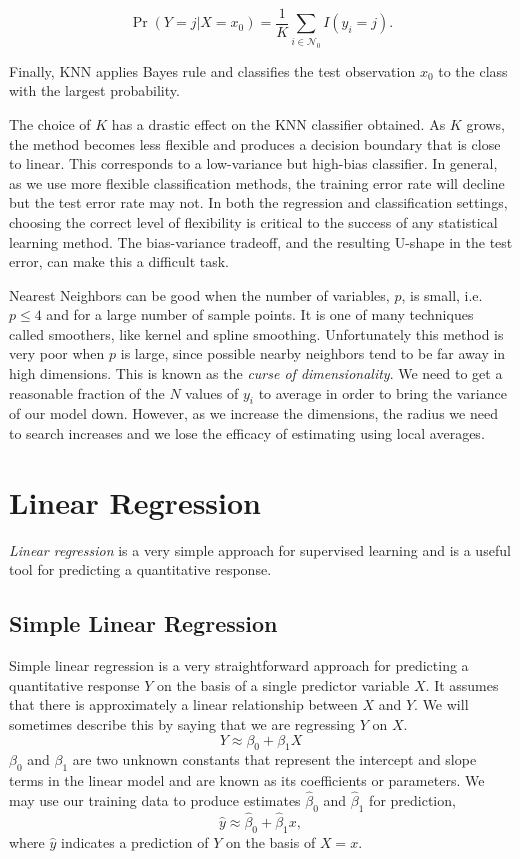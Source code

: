 \documentclass{article}
\numberwithin{equation}{section}
\begin{document}
\begin{equation}
    \Pr(Y = j|X = x_0) = \frac{1}{K} \sum_{i \in \mathcal N_0} I(y_i = j).
\end{equation}

Finally, KNN applies Bayes rule and classifies the test observation $x_0$ to the class with the largest probability.

The choice of $K$ has a drastic effect on the KNN classifier obtained. As $K$ grows, the method becomes less flexible and produces a decision boundary that is close to linear. This corresponds to a low-variance but high-bias classifier. In
general, as we use more flexible classification methods, the training error rate will decline but the test error rate may not. In both the regression and classification settings, choosing the correct level of flexibility is critical to the success of any statistical learning method. The bias-variance tradeoff, and the resulting U-shape in the test error, can make this a difficult task. 

Nearest Neighbors can be good when the number of variables, $p$, is small, i.e. $p \leq 4$ and for a large number of sample points. It is one of many techniques called smoothers, like kernel and spline smoothing. Unfortunately this method is very poor when $p$ is large, since possible nearby neighbors tend to be far away in high dimensions. This is known as the \textit{curse of dimensionality}. We need to get a reasonable fraction of the $N$ values of $y_i$ to average in order to bring the variance of our model down. However, as we increase the dimensions, the radius we need to search increases and we lose the efficacy of estimating using local averages.

\newpage
\section{Linear Regression}
\textit{Linear regression} is a very simple approach for supervised learning and is a useful tool for predicting a quantitative response.

\subsection{Simple Linear Regression}

Simple linear regression  is a very straightforward approach for predicting a quantitative response $Y$ on the basis of a single predictor variable $X$. It assumes that there is approximately a linear relationship between $X$ and $Y$. We will sometimes describe this by saying that we are regressing $Y$ on $X$.
\begin{equation}
    Y \approx \beta_0 + \beta_1 X
\end{equation}
$\beta_0$ and $\beta_1$ are two unknown constants that represent the intercept and slope terms in the linear model and are known as its coefficients or parameters. We may use our training data to produce estimates $\hat \beta_0$ and $\hat \beta_1$ for prediction,
\begin{equation}
    \hat y  \approx \hat \beta_0 + \hat \beta_1 x,
\end{equation}
where $\hat y$ indicates a prediction of $Y$ on the basis of $X = x$.
\end{document}
